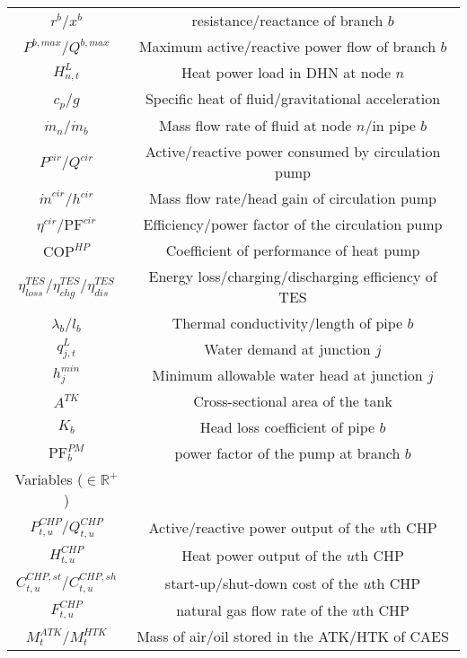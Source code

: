 \documentclass[journal,twoside,web]{ieeecolor}
\begin{document}
\begin{table}[htbp]
\begin{tabular}{cc}
            $r^b$/$x^b$ & resistance/reactance of branch $b$\\
            $P^{b,max}$/$Q^{b,max}$ & Maximum active/reactive power flow of branch $b$ \\
            $H^L_{n,t}$ & Heat power load in DHN at node $n$  \\
            $c_p$/$g$ & Specific heat of fluid/gravitational acceleration \\
            $\dot m_n$/$\dot m_b$ & Mass flow rate of fluid at node $n$/in pipe $b$ \\
            $P^{cir}$/$Q^{cir}$ & Active/reactive power consumed by circulation pump \\
            $\dot m^{cir}$/$h^{cir}$ & Mass flow rate/head gain of circulation pump \\
            $\eta^{cir}$/$\text{PF}^{cir}$ & Efficiency/power factor of the circulation pump \\
            $\text{COP}^{HP}$ & Coefficient of performance of heat pump\\
            $\eta^{TES}_{loss}$/$\eta^{TES}_{chg}$/$\eta^{TES}_{dis}$ & Energy loss/charging/discharging efficiency of TES\\
            $\lambda_b$/$l_b$ & Thermal conductivity/length of pipe $b$\\
            $q^L_{j,t}$ & Water demand at junction $j$ \\
            $h_j^{min}$ & Minimum allowable water head at junction $j$\\
            $A^{TK}$ & Cross-sectional area of the tank\\
            $K_b$ & Head loss coefficient of pipe $b$ \\
            $\text{PF}^{PM}_b$ & power factor of the pump at branch $b$ \\
            \hline
            Variables ($\in \mathbb{R}^+$)\\
            \hline
            $P^{CHP}_{t,u}$/$Q^{CHP}_{t,u}$ & Active/reactive power output of the $u$th CHP \\
            $H^{CHP}_{t,u}$ & Heat power output of the $u$th CHP \\
            $C^{CHP,st}_{t,u}$/$C^{CHP,sh}_{t,u}$ & start-up/shut-down cost of the $u$th CHP \\
            $F^{CHP}_{t,u}$ & natural gas flow rate of the $u$th CHP \\
            $M^{ATK}_t$/$M^{HTK}_t$ & Mass of air/oil stored in the ATK/HTK of CAES \\

\end{tabular}
\end{table}
\end{document}
